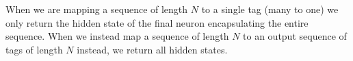 

    When we are mapping a sequence of length $N$ to a single tag (many to one) we only return the hidden state of the final \gls{neuron} encapsulating the entire sequence. When we instead map a sequence of length $N$ to an output sequence of tags of length $N$ instead, we return all hidden states.
